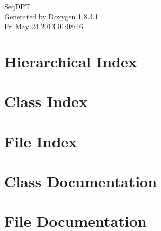 \documentclass{book}
\begin{document}
\hypersetup{pageanchor=false,citecolor=blue}
\begin{titlepage}
\vspace*{7cm}
\begin{center}
{\Large Seq\-D\-P\-T }\\
\vspace*{1cm}
{\large Generated by Doxygen 1.8.3.1}\\
\vspace*{0.5cm}
{\small Fri May 24 2013 01:08:46}\\
\end{center}
\end{titlepage}
\clearemptydoublepage
{}
\tableofcontents
\clearemptydoublepage
{}
\hypersetup{pageanchor=true,citecolor=blue}
\chapter{Hierarchical Index}

\chapter{Class Index}

\chapter{File Index}

\chapter{Class Documentation}


















\chapter{File Documentation}



\printindex
\end{document}

